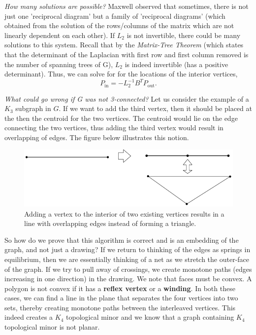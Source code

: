 \documentclass{article}
\begin{document}
  \noindent \textit{How many solutions are possible?}
  Maxwell observed that sometimes, there is not just one 'reciprocal diagram' but a family of 'reciprocal diagrams' (which obtained from the solution of the rows/columns of the matrix which are not linearly dependent on each other).
  If $L_2$ is not invertible, there could be many solutions to this system. Recall that by the \textit{Matrix-Tree Theorem} (which states that the determinant of the Laplacian with first row and first column removed is the number of spanning trees of G), $L_2$ is indeed invertible (has a positive determinant). Thus, we can solve for for the locations of the interior vertices, $$P_{\text{in}} = -L_2^{-1}B^T P_{\text{out}}.$$
  
  \textit{What could go wrong if G was not 3-connected?} Let us consider the example of a $K_3$ subgraph in $G$. If we want to add the third vertex, then it should be placed at the then the centroid for the two vertices. The centroid would lie on the edge connecting the two vertices, thus adding the third vertex would result in overlapping of edges. The figure below illustrates this notion.
  
  \medskip \noindent 
      \begin{figure}[H]
    \centering
    \includegraphics[scale=0.5]{Images/k3_centroid.png}
    \caption{Adding a vertex to the interior of two existing vertices results in a line with overlapping edges instead of forming a triangle.}
    \label{fig:my_label}
    \end{figure}
  
    \medskip \noindent So how do we prove that this algorithm is correct and is an embedding of the graph, and not just a drawing? If we return to thinking of the edges as springs in equilibrium, then we are essentially thinking of a net as we stretch the outer-face of the graph. If we try to pull away of crossings, we create monotone paths (edges increasing in one direction) in the drawing. We note that faces must be convex. A polygon is not convex if it has a \textbf{reflex vertex} or a \textbf{winding}. In both these cases, we can find a line in the plane that separates the four vertices into two sets, thereby creating monotone paths between the interleaved vertices. This indeed creates a $K_4$ topological minor and we know that a graph containing $K_4$ topological minor is not planar.
  
\end{document}

